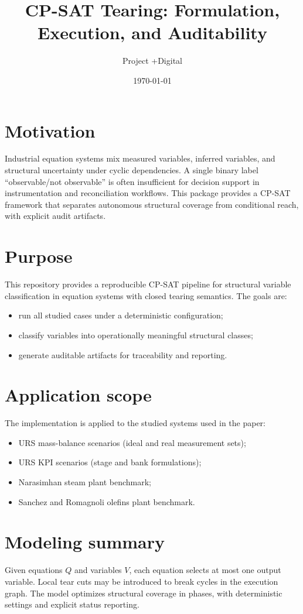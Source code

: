 \documentclass[11pt]{article}
\title{CP-SAT Tearing: Formulation, Execution, and Auditability}
\author{Project +Digital}
\date{\today}
\begin{document}
\maketitle

\section{Motivation}
Industrial equation systems mix measured variables, inferred variables, and
structural uncertainty under cyclic dependencies. A single binary label
``observable/not observable'' is often insufficient for decision support in
instrumentation and reconciliation workflows. This package provides a CP-SAT
framework that separates autonomous structural coverage from conditional reach,
with explicit audit artifacts.

\section{Purpose}
This repository provides a reproducible CP-SAT pipeline for structural variable
classification in equation systems with closed tearing semantics. The goals are:
\begin{itemize}
  \item run all studied cases under a deterministic configuration;
  \item classify variables into operationally meaningful structural classes;
  \item generate auditable artifacts for traceability and reporting.
\end{itemize}

\section{Application scope}
The implementation is applied to the studied systems used in the paper:
\begin{itemize}
  \item URS mass-balance scenarios (ideal and real measurement sets);
  \item URS KPI scenarios (stage and bank formulations);
  \item Narasimhan steam plant benchmark;
  \item Sanchez and Romagnoli olefins plant benchmark.
\end{itemize}

\section{Modeling summary}
Given equations $Q$ and variables $V$, each equation selects at most one output
variable. Local tear cuts may be introduced to break cycles in the execution
graph. The model optimizes structural coverage in phases, with deterministic
settings and explicit status reporting.
\end{document}
